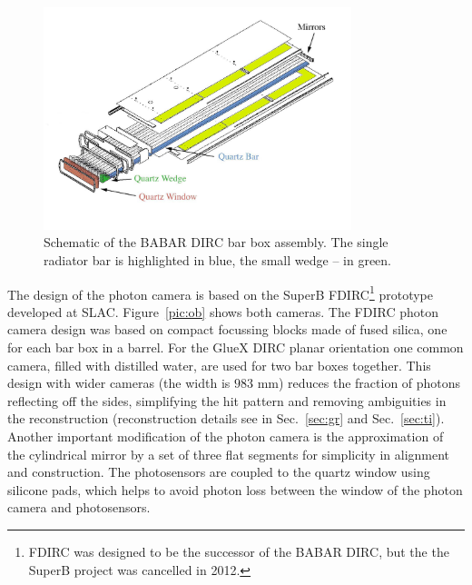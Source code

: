 \documentclass[11pt, a4paper]{article}
\begin{document}
\begin{figure}[!h]
\centering
\includegraphics[width=0.8\textwidth]{pics/bab_col.jpg}
\caption{\label{pic:bbox} Schematic of the BABAR DIRC bar box assembly. The single radiator bar is highlighted in blue, the small wedge -- in green.}
\end{figure}

The design of the photon camera is based on the SuperB FDIRC\footnote{FDIRC was designed to be the successor of the BABAR DIRC, but the the SuperB project was cancelled in 2012.} prototype~\cite{fdirc} developed at SLAC. Figure~\ref{pic:ob} shows both cameras. The FDIRC photon camera design was based on compact focussing blocks made of fused silica, one for each bar box in a barrel. For the GlueX DIRC planar orientation one common camera, filled with distilled water, are used for two bar boxes together. This design with wider cameras (the width is $983$ mm) reduces the fraction of photons reflecting off the sides, simplifying the hit pattern and removing ambiguities in the reconstruction (reconstruction details see in Sec.~\ref{sec:gr} and Sec.~\ref{sec:ti}). Another important modification of the photon camera is the approximation of the cylindrical mirror by a set of three flat segments for simplicity in alignment and construction. The photosensors are coupled to the quartz window using silicone pads, which helps to avoid photon loss between the window of the photon camera and photosensors. 
\end{document}
